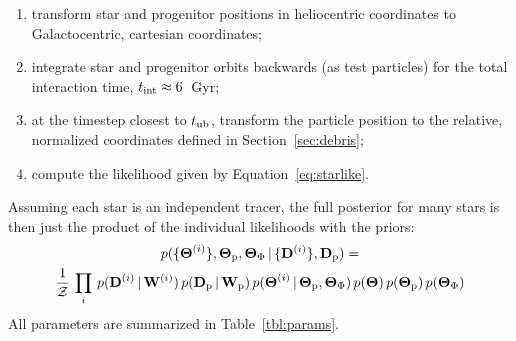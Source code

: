 \documentclass[letterpaper,12pt,preprint]{aastex}
\newcommand{\given}{\,|\,}
\newcommand{\D}{{\bf D}}
\newcommand{\W}{{\bf W}}
\newcommand{\bs}{\boldsymbol}
\newcommand{\sat}{{\rm p}}
\newcommand{\tub}{t_{\rm ub}}
\newcommand{\tailbit}{\beta}
\newcommand{\Loffset}{\alpha}
\begin{document}
\begin{enumerate}
	\item transform star and progenitor positions in heliocentric coordinates to Galactocentric, cartesian coordinates;
	\item integrate star and progenitor orbits backwards (as test particles) for the total interaction time, $t_{\rm int}\approx6$~Gyr;
	\item at the timestep closest to $\tub$, transform the particle position to the relative, normalized coordinates defined in Section~\ref{sec:debris};
	\item compute the likelihood given by Equation~\ref{eq:starlike}.
\end{enumerate}
Assuming each star is an independent tracer, the full posterior for many stars is then just the product of the individual likelihoods with the priors:
\begin{multline}
	p(\{\bs{\Theta}^{(i)}\}, \bs{\Theta}_\sat, \bs{\Theta}_\Phi \given \{\D^{(i)}\}, \D_\sat) = \\
		\frac{1}{\mathcal{Z}} \, \prod_i \, p(\D^{(i)} \given \W^{(i)}) \, p(\D_\sat \given \W_\sat)\,
			p(\bs{\Theta}^{(i)} \given \bs{\Theta}_\sat, \bs{\Theta}_\Phi) \, 
			p(\bs{\Theta}) \, p(\bs{\Theta}_\sat)\,p(\bs{\Theta}_\Phi)
\end{multline}
All parameters are summarized in Table~\ref{tbl:params}.
\end{document}
